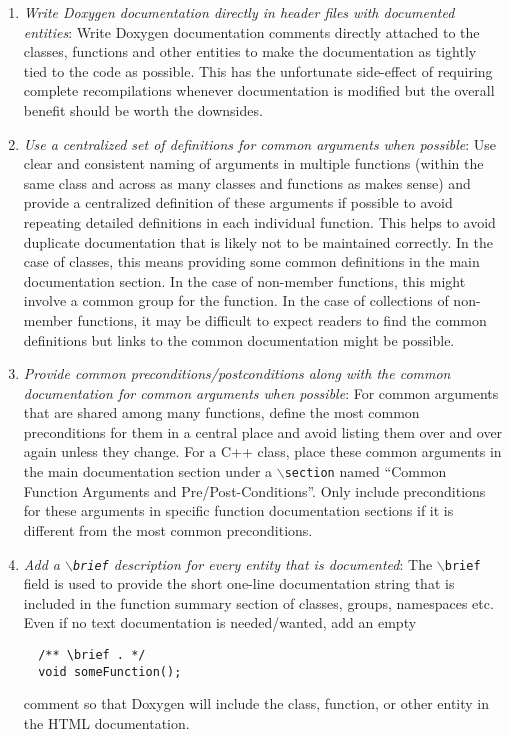 \begin{enumerate}

{}\item\textit{Write Doxygen documentation directly in header files with
documented entities}: Write Doxygen documentation comments directly attached to
the classes, functions and other entities to make the documentation as tightly
tied to the code as possible.  This has the unfortunate side-effect of
requiring complete recompilations whenever documentation is modified but the
overall benefit should be worth the downsides.

{}\item\textit{Use a centralized set of definitions for common arguments when
possible}: Use clear and consistent naming of arguments in multiple functions
(within the same class and across as many classes and functions as makes
sense) and provide a centralized definition of these arguments if possible
to avoid repeating detailed definitions in each individual function.  This
helps to avoid duplicate documentation that is likely not to be maintained
correctly.  In the case of classes, this means providing some common
definitions in the main documentation section.  In the case of non-member
functions, this might involve a common group for the function.  In the case
of collections of non-member functions, it may be difficult to expect readers
to find the common definitions but links to the common documentation might be
possible.

{}\item\textit{Provide common preconditions/postconditions along with the
common documentation for common arguments when possible}: For common arguments
that are shared among many functions, define the most common preconditions for
them in a central place and avoid listing them over and over again unless they
change.  For a C++ class, place these common arguments in the main
documentation section under a {}\texttt{$\backslash$section} named ``Common
Function Arguments and Pre/Post-Conditions''.  Only include preconditions for
these arguments in specific function documentation sections if it is different
from the most common preconditions.

{}\item\textit{Add a {}\texttt{$\backslash$brief} description for every entity
that is documented}: The {}\texttt{$\backslash$brief} field is used to provide
the short one-line documentation string that is included in the function
summary section of classes, groups, namespaces etc.  Even if no text
documentation is needed/wanted, add an empty
%
{\small\begin{verbatim}
  /** \brief . */
  void someFunction();
\end{verbatim}}
%
comment so that Doxygen will include the class, function, or other entity in
the HTML documentation.


\end{enumerate}
